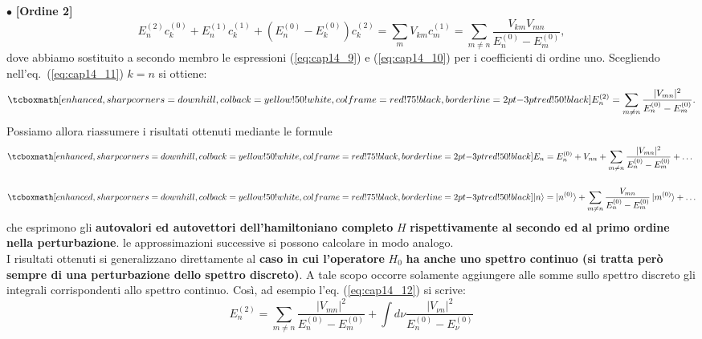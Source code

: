 $\bullet$ \textbf{[Ordine 2]}\\
	\begin{equation}
			E_n^{(2)}c_k^{(0)}+E_n^{(1)}c_k^{(1)}+ \left( E_n^{(0)}-E_k ^{(0)}\right) c_k^{(2)}  = \sum _m V_{km} c_m ^{(1)} = \sum _{m\neq n} \frac{V_{km} V_{mn}}{E_n^{(0)}-E_m ^{(0)}},
	\label{eq:cap14_11}
	\end{equation}
dove abbiamo sostituito a secondo membro le espressioni (\ref{eq:cap14_9}) e (\ref{eq:cap14_10}) per i coefficienti di ordine uno. Scegliendo nell'eq.~(\ref{eq:cap14_11}) $k=n$ si ottiene:
	\begin{equation}
		\tcboxmath[enhanced, sharp corners=downhill, colback=yellow!50!white, colframe=red!75!black, borderline={2pt}{-3pt}{red!50!black}]{
			E_n ^{(2)} = \sum _{m \neq n } \frac{\vert V_{mn} \vert ^2}{E_n ^{(0)}-E_m ^{(0)}}.
			}
	\label{eq:cap14_12}
	\end{equation}
Possiamo allora riassumere i risultati ottenuti mediante le formule
	\begin{align}
		& \tcboxmath[enhanced, sharp corners=downhill, colback=yellow!50!white, colframe=red!75!black, borderline={2pt}{-3pt}{red!50!black}]{
			E_n = E_n ^{(0)}+ V_{nn} +\sum _{m \neq n } \frac{\vert V_{mn} \vert ^2}{E_n ^{(0)}-E_m ^{(0)}}+ \dots
			} \\[0.5cm]
		& \tcboxmath[enhanced, sharp corners=downhill, colback=yellow!50!white, colframe=red!75!black, borderline={2pt}{-3pt}{red!50!black}]{
 			\vert n \rangle = \vert n^{(0)} \rangle +\sum _{m \neq n } \frac{V_{mn} }{E_n ^{(0)}-E_m ^{(0)}}\, \vert m^{(0)}\rangle+ \dots 
			 }
	\end{align}
che esprimono gli \textbf{autovalori ed autovettori dell'hamiltoniano completo} $H$ \textbf{rispettivamente al secondo ed al primo ordine nella perturbazione}. le approssimazioni successive si possono calcolare in modo analogo.\\

I risultati ottenuti si generalizzano direttamente al \textbf{caso in cui l'operatore} $H_0$ \textbf{ha anche uno spettro continuo (si tratta però sempre di una perturbazione dello spettro discreto)}. A tale scopo occorre solamente aggiungere alle somme sullo spettro discreto gli integrali corrispondenti allo spettro continuo. Così, ad esempio l'eq. (\ref{eq:cap14_12}) si scrive:
	\begin{equation}
		E_n ^{(2)} = \sum _{m \neq n} \frac{\vert V_{mn} \vert ^2}{E_n ^{(0)}-E_m ^{(0)}}+ \int d\nu \frac{\vert V_{\nu n} \vert ^2}{E_n ^{(0)}-E_{\nu} ^{(0)}} 
	\end{equation}
